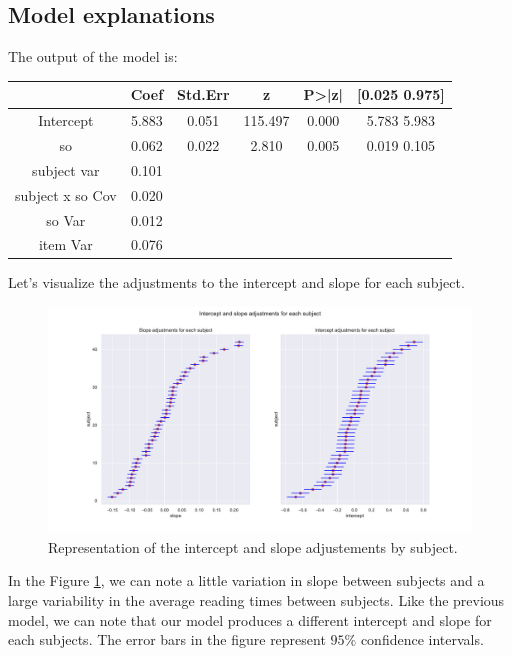 \documentclass{article}
\begin{document}
\subsection{Model explanations}
The output of the model is:
\begin{center}
    \begin{tabular}{|c|c|c|c|c|c|}
    \hline
         & Coef & Std.Err & z & P>|z| & [0.025 0.975]  \\
         \hline \hline
        Intercept & 5.883 & 0.051 & 115.497 & 0.000 & 5.783 5.983\\
         so & 0.062 & 0.022 & 2.810 & 0.005 & 0.019 0.105 \\
         subject var &  0.101 &  &  & & \\
         subject x so Cov & 0.020 &  & & &\\
         so Var & 0.012 &  & & &\\
         item Var & 0.076 & & & &\\
         \hline
    \end{tabular}
\end{center}

Let's visualize the adjustments to the intercept and slope for each subject.

\begin{figure}[H]
    \centering
    \includegraphics[scale=.42]{./images/model3_inter.pdf}
    \caption{Representation of the intercept and slope adjustements by subject.}
    \label{fig:model3}
\end{figure}

In the Figure \ref{fig:model3}, we can note a little variation in slope between subjects and  a large variability in the average reading times between subjects. Like the previous model, we can note that our model produces a different intercept and slope for each subjects. The error bars in the figure represent $95\%$ confidence intervals.
\end{document}
